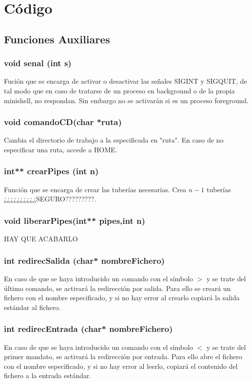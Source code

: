 \chapter{Código}
\section{Funciones Auxiliares}
\subsection{void senal (int s)}
Fución que se encarga de activar o desactivar las señales SIGINT y SIGQUIT, de tal modo que en caso de tratarse de un proceso en background o de la propia minishell, no respondan. Sin embargo no se activarán si es un proceso foreground.
\subsection{void comandoCD(char *ruta)}
Cambia el directorio de trabajo a la especificada en "ruta". En caso de no especificar una ruta, accede a HOME.
\subsection{int** crearPipes (int n)}
Función que se encarga de crear las tuberías necesarias. Crea $n-1$ tuberías ¿¿¿¿¿¿¿¿¿¿SEGURO?????????.
\subsection{void liberarPipes(int** pipes,int n)}
HAY QUE ACABARLO
\subsection{int redirecSalida (char* nombreFichero)}
En caso de que se haya introducido un comando con el símbolo $>$ y se trate del último comando, se activará la redirección por salida. Para ello se creará un fichero con el nombre especificado, y si no hay error al crearlo copiará la salida estándar al fichero.
\subsection{int redirecEntrada (char* nombreFichero)}
En caso de que se haya introducido un comando con el símbolo $<$ y se trate del primer mandato, se activará la redirección por entrada. Para ello abre el fichero con el nombre especificado, y si no hay error al leerlo, copiará el contenido del fichero a la entrada estándar.
